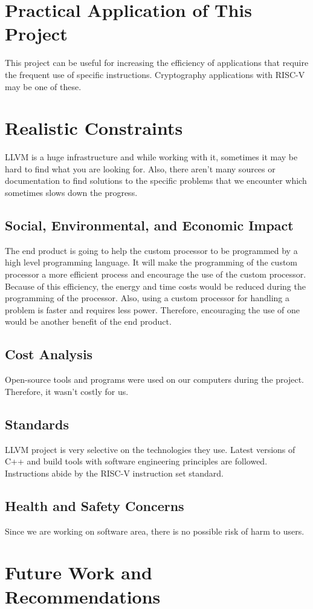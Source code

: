 \section{Practical Application of This Project}
This project can be useful for increasing the efficiency of applications that require the frequent use of specific instructions. Cryptography applications with RISC-V may be one of these.

\section{Realistic Constraints}
LLVM is a huge infrastructure and while working with it, sometimes it may be hard to find what you are looking for. Also, there aren’t many sources or documentation to find solutions to the specific problems that we encounter which sometimes slows down the progress.

\subsection{Social, Environmental, and Economic Impact}
The end product is going to help the custom processor to be programmed by a high level programming language. It will make the programming of the custom processor a more efficient process and encourage the use of the custom processor. Because of this efficiency, the energy and time costs would be reduced during the programming of the processor. Also, using a custom processor for handling a problem is faster and requires less power. Therefore, encouraging the use of one would be another benefit of the end product.

\subsection{Cost Analysis}
Open-source tools and programs were used on our computers during the project. Therefore, it wasn’t costly for us.

\subsection{Standards}
LLVM project is very selective on the technologies they use. Latest versions of C++ and build tools with software engineering principles are followed. Instructions abide by the RISC-V instruction set standard.

\subsection{Health and Safety Concerns}
Since we are working on software area, there is no possible risk of harm to users.

\section{Future Work and Recommendations}

